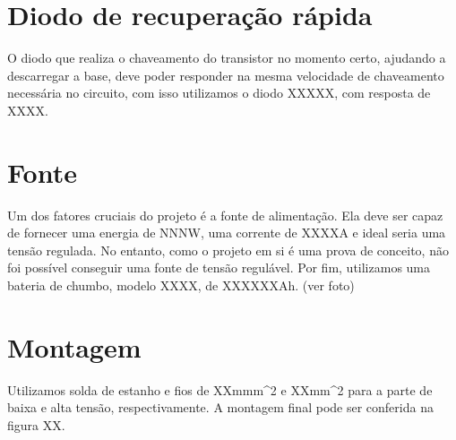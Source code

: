 \section{Diodo de recuperação rápida}
O diodo que realiza o chaveamento do transistor no momento certo, ajudando a descarregar a base, deve poder responder na mesma velocidade de chaveamento necessária no circuito, com isso utilizamos o diodo XXXXX, com resposta de XXXX.
\section{Fonte}
Um dos fatores cruciais do projeto é a fonte de alimentação. Ela deve ser capaz de fornecer uma energia de NNNW, uma corrente de XXXXA e ideal seria uma tensão regulada. No entanto, como o projeto em si é uma prova de conceito, não foi possível conseguir uma fonte de tensão regulável. Por fim, utilizamos uma bateria de chumbo, modelo XXXX, de XXXXXXAh. (ver foto)
\section{Montagem}
Utilizamos solda de estanho e fios de XXmmm^2 e XXmm^2 para a parte de baixa e alta tensão, respectivamente. A montagem final pode ser conferida na figura XX.